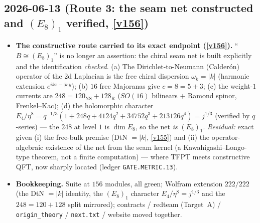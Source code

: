 \subsection*{2026-06-13 (Route 3: the seam net constructed and $(E_8)_1$ verified, \vref{v156})}
\begin{itemize}
\item \textbf{The constructive route carried to its exact endpoint (\vref{v156}).} ``$B\cong(E_8)_1$''
  is no longer an assertion: the chiral seam net is built explicitly and the identification \emph{checked}.
  (a) The Dirichlet-to-Neumann (Calder\'on) operator of the $2$d Laplacian is the free chiral dispersion
  $\omega_k=|k|$ (harmonic extension $e^{ikx-|k|y}$); (b) $16$ free Majoranas give $c=8=5{+}3$; (c) the
  weight-$1$ currents are $248=120_{\mathrm{NS}}+128_{\mathrm R}$ ($SO(16)$ bilinears $+$ Ramond spinor,
  Frenkel--Kac); (d) the holomorphic character $E_4/\eta^8=q^{-1/3}(1+248q+4124q^2+34752q^3+213126q^4)
  =j^{1/3}$ (verified by $q$-series) --- the $248$ at level $1$ is $\dim E_8$, so the net \emph{is}
  $(E_8)_1$. \emph{Residual:} exact given (i) the free-bulk premise (DtN $=|k|$, \vref{v155}) and (ii) the
  operator-algebraic existence of the net from the seam kernel (a Kawahigashi--Longo-type theorem, not a
  finite computation) --- where TFPT meets constructive QFT, now sharply located (ledger
  \texttt{GATE.METRIC.13}).
\item \textbf{Bookkeeping.} Suite at $156$ modules, all green; Wolfram extension $222/222$ (the DtN $=|k|$
  identity, the $(E_8)_1$ character $E_4/\eta^8=j^{1/3}$ and the $248{=}120{+}128$ split mirrored);
  contracts / redteam (Target~A) / \texttt{origin\_theory} / \texttt{next.txt} / website moved together.
\end{itemize}

